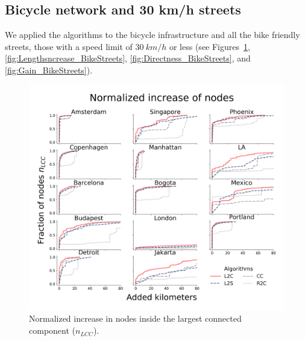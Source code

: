 \subsection{Bicycle network and 30 km/h streets}\label{SI:BikeStreets}
We applied the algorithms to the bicycle infrastructure and all the bike friendly streets, those with a speed limit of $30\ km/h$ or less (see Figures~\ref{fig:NodesIncrease_BikeStreets}, \ref{fig:Lengthsncrease_BikeStreets}, \ref{fig:Directness_BikeStreets}, and \ref{fig:Gain_BikeStreets}).

\begin{figure}[h!]
  \centering
  \includegraphics[width=\textwidth]{images/datadriven/SI_Nodes_Bike_Streets.png}
  \caption{Normalized increase in nodes inside the largest connected component ($n_{LCC}$).}
  \label{fig:NodesIncrease_BikeStreets}
\end{figure}


